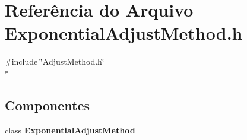 \section{Referência do Arquivo Exponential\+Adjust\+Method.\+h}
\label{_exponential_adjust_method_8h}
{\ttfamily \#include \char`\"{}Adjust\+Method.\+h\char`\"{}}\\*
\subsection*{Componentes}
\begin{DoxyCompactItemize}
\item 
class {\bf Exponential\+Adjust\+Method}
\end{DoxyCompactItemize}
